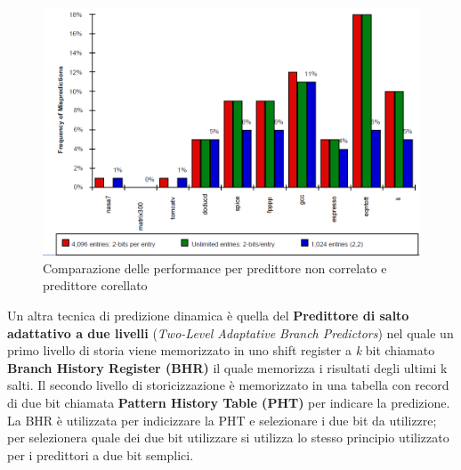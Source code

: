 \begin{figure}[htb]
\centering
\includegraphics[scale=0.5]{img/performance.png}
\caption{Comparazione delle performance per predittore non correlato e predittore corellato}\label{fig:performance}
\end{figure}
Un altra tecnica di predizione dinamica è quella del \textbf{Predittore di salto adattativo a due livelli} (\emph{Two-Level Adaptative Branch Predictors}) nel quale un primo livello di storia viene memorizzato in uno shift register a \emph{k} bit chiamato \textbf{Branch History Register (BHR)} il quale memorizza i risultati degli ultimi k salti. Il secondo livello di storicizzazione è memorizzato in una tabella con record di due bit chiamata \textbf{Pattern History Table (PHT)} per indicare la predizione.
La BHR è utilizzata per indicizzare la PHT e selezionare i due bit da utilizzre; per selezionera quale dei due bit utilizzare si utilizza lo stesso principio utilizzato per i predittori a due bit semplici.
